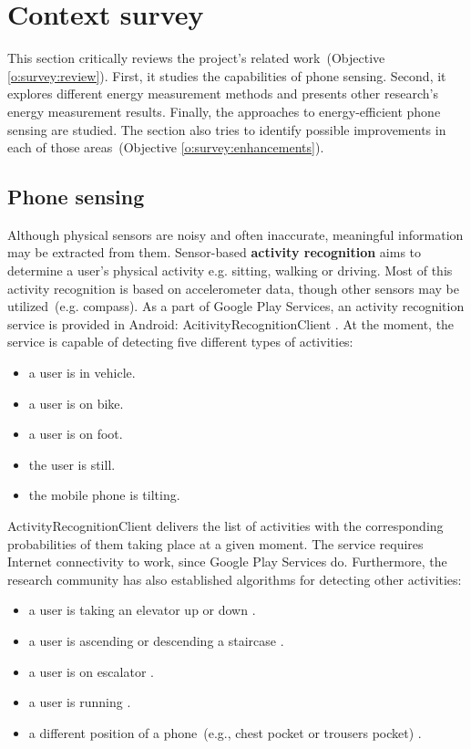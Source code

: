 \section{Context survey}
\label{s:contextsurvey}
\hspace{10pt} This section critically reviews the project's related work\ (Objective \ref{o:survey:review}). First, it studies the capabilities of phone sensing. Second, it explores different energy measurement methods and presents other research's energy measurement results. Finally, the approaches to energy-efficient phone sensing are studied. The section also tries to identify possible improvements in each of those areas\ (Objective \ref{o:survey:enhancements}).

\subsection{Phone sensing}
\hspace{10pt} Although physical sensors are noisy and often inaccurate, meaningful information may be extracted from them. Sensor-based \textbf{activity recognition} aims to determine a user's physical activity e.g. sitting, walking or driving. Most of this activity recognition is based on accelerometer data, though other sensors may be utilized\ (e.g. compass). As a part of Google Play Services, an activity recognition service is provided in Android: AcitivityRecognitionClient \cite{android:activityrecognition}. At the moment, the service is capable of detecting five different types of activities: 
 \begin{itemize}
  	\item a user is in vehicle.
    \item a user is on bike.
    \item a user is on foot.
    \item the user is still.
    \item the mobile phone is tilting.
  \end{itemize}
  
ActivityRecognitionClient delivers the list of activities with the corresponding probabilities of them taking place at a given moment. The service requires Internet connectivity to work, since Google Play Services do. Furthermore, the research community has also established algorithms for detecting other activities:
 \begin{itemize}
  	\item a user is taking an elevator up or down \cite{Wang:unsupervised}.
    \item a user is ascending or descending a staircase \cite{Wang:unsupervised}.
    \item a user is on escalator \cite{Wang:unsupervised}.
    \item a user is running \cite{miluzzo:cenceme}.
    \item a different position of a phone\ (e.g., chest pocket or trousers pocket) \cite{kawahara:positions}.
  \end{itemize}

